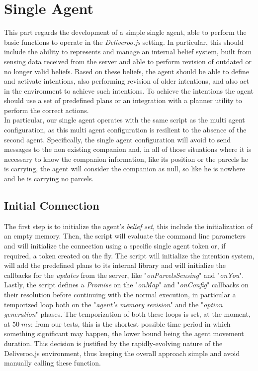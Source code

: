 \section{Single Agent}
    This part regards the development of a simple single agent, able to perform the basic functions to operate in the \textit{Deliveroo.js} setting. In particular, this should include the ability to represents and manage an internal belief system, built from sensing data received from the server and able to perform revision of outdated or no longer valid beliefs. Based on these beliefs, the agent should be able to define and activate  intentions, also performing revision of older intentions, and also act in the environment to achieve such intentions. To achieve the intentions the agent should use a set of predefined plans or an integration with a planner utility to perform the correct actions.
    \medskip\\    
    In particular, our single agent operates with the same script as the multi agent configuration, as this multi agent configuration is resilient to the absence of the second agent. Specifically, the single agent configuration will avoid to send messages to the non existing companion and, in all of those situations where it is necessary to know the companion information, like its position or the parcels he is carrying, the agent will consider the companion as null, so like he is nowhere and he is carrying no parcels.

    \subsection{Initial Connection}
        The first step is to initialize the agent's \textit{belief set}, this include the initialization of an empty memory. Then, the script will evaluate the command line parameters and will initialize the connection using a specific single agent token or, if required, a token created on the fly. The script will initialize the intention system, will add the predefined plans to its internal library and will initialize the callbacks for the \textit{updates} from the server, like "\textit{onParcelsSensing}" and "\textit{onYou}". Lastly, the script defines a \textit{Promise} on the "\textit{onMap}" and "\textit{onConfig}" callbacks on their resolution before continuing with the normal execution, in particular a temporized loop both on the "\textit{agent's memory revision}" and the "\textit{option generation}" phases. The temporization of both these loops is set, at the moment, at $50\;ms$: from our tests, this is the shortest possible time period in which something significant may happen, the lower bound being the agent movement duration. This decision is justified by the rapidly-evolving nature of the Deliveroo.js environment, thus keeping the overall approach simple and avoid manually calling these function.

